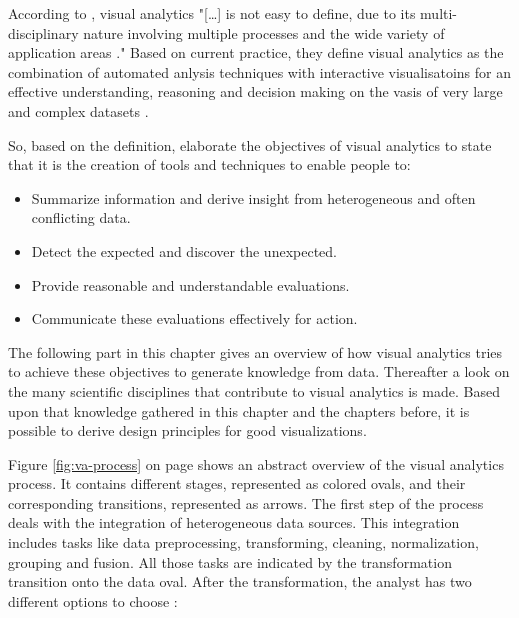 According to \citeauthor{Keim2010}, visual analytics "[\ldots] is not easy to define, due to its multi-disciplinary nature involving multiple processes and the wide variety of application areas ." Based on current practice, they define visual analytics as the combination of automated anlysis techniques with interactive visualisatoins for an effective understanding, reasoning and decision making on the vasis of very large and complex datasets .

So, based on the definition, \citeauthor{Keim2010} elaborate the objectives of visual analytics to state that it is the creation of tools and techniques to enable people to:

\begin{itemize}
\item Summarize information and derive insight from heterogeneous and often conflicting data.
\item Detect the expected and discover the unexpected.
\item Provide reasonable and understandable evaluations.
\item Communicate these evaluations effectively for action.
\end{itemize}

The following part in this chapter gives an overview of how visual analytics tries to achieve these objectives to generate knowledge from data. Thereafter a look on the many scientific disciplines that contribute to visual analytics is made.
Based upon that knowledge gathered in this chapter and the chapters before, it is possible to derive design principles for good visualizations.

Figure \ref{fig:va-process} on page \pageref{fig:va-process} shows an abstract overview of the visual analytics process. It contains different stages, represented as colored ovals, and their corresponding transitions, represented as arrows. The first step of the process deals with the integration of heterogeneous data sources. This integration includes tasks like data preprocessing, transforming, cleaning, normalization, grouping and fusion. All those tasks are indicated by the transformation transition onto the data oval. After the transformation, the analyst has two different options to choose :

